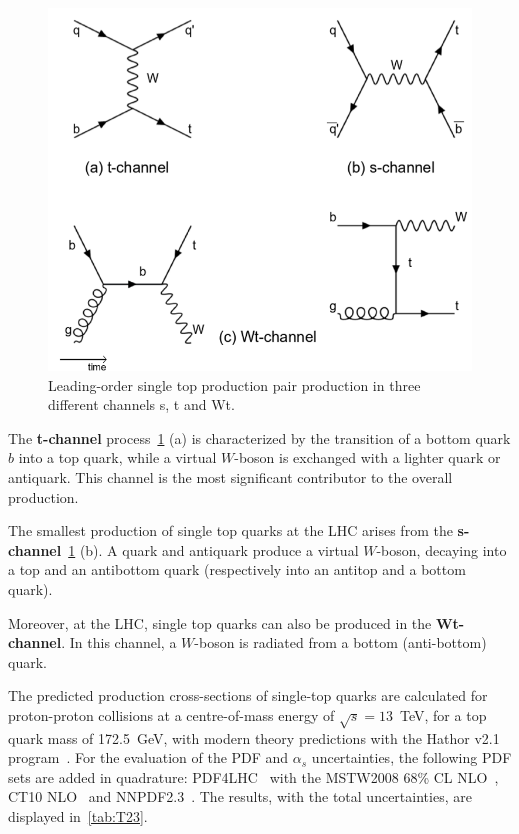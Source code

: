 \begin{figure}[h]
	\centering
	\includegraphics[width=0.5\linewidth]{Pics/cp1/single}
	\caption{Leading-order single top production pair production in three different channels s, t and Wt.} 
	\label{fig:single}
\end{figure}

 The \textbf{t-channel} process~\cref{fig:single} (a) is characterized by the transition of a bottom quark $b$ into a top quark, while a virtual $W$-boson is exchanged with a lighter quark or antiquark. This channel is the most significant contributor to the overall production.

The smallest production of single top quarks at the LHC arises from the \textbf{s-channel}~\cref{fig:single} (b). A quark and antiquark produce a virtual $W$-boson, decaying into a top and an antibottom quark (respectively into an antitop and a bottom quark).

Moreover, at the LHC, single top quarks can also be produced in the \textbf{Wt-channel}. In this channel, a $W$-boson is radiated from a bottom (anti-bottom) quark.

The  predicted production cross-sections of single-top quarks are calculated  for proton-proton collisions at a centre-of-mass energy of $\sqrt{s}=13$~TeV, for a top quark mass of 172.5~GeV, with modern theory predictions with the Hathor v2.1 program~\cite{Aliev:2010zk,Kant:2014oha}. For the evaluation of the PDF and $\alpha_{s}$ uncertainties, the following PDF sets are added in quadrature: PDF4LHC~\cite{Botje:2011sn} with the MSTW2008 68\% CL NLO~\cite{Martin:2009bu,Martin:2009iq}, CT10 NLO~\cite{Lai:2010vv} and NNPDF2.3~\cite{Ball:2012cx}. The results, with the total uncertainties, are displayed in~\cref{tab:T23}.



